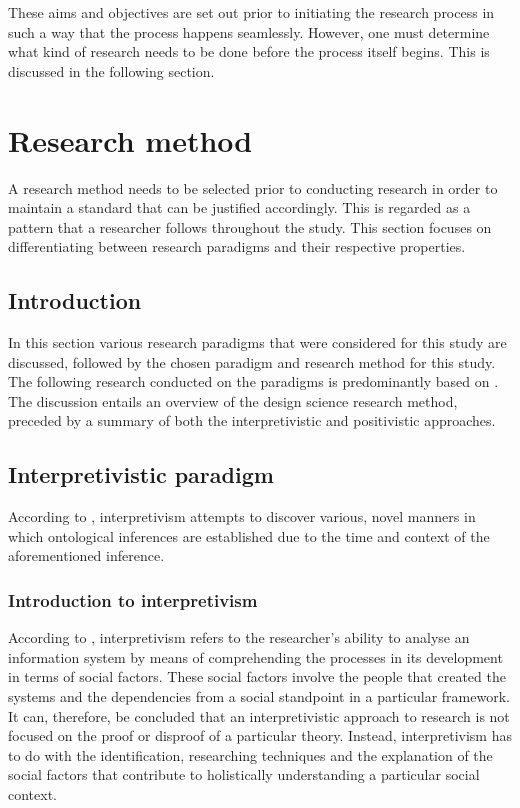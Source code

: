 These aims and objectives are set out prior to initiating the research process in such a way that the process happens seamlessly. However, one must determine what kind of research needs to be done before the process itself begins. This is discussed in the following section.

\section{Research method}  %
A research method needs to be selected prior to conducting research in order to maintain a standard that can be justified accordingly. This is regarded as a pattern that a researcher follows throughout the study. This section focuses on differentiating between research paradigms and their respective properties.

\subsection{Introduction}
In this section various research paradigms that were considered for this study are discussed, followed by the chosen paradigm and research method for this study. The following research conducted on the paradigms is predominantly based on \citep{OatesJ2006}. The discussion entails an overview of the design science research method, preceded by a summary of both the interpretivistic and positivistic approaches.

\subsection{Interpretivistic paradigm}
According to \cite{DeVilliers2005}, interpretivism attempts to discover various, novel manners in which ontological inferences are established due to the time and context of the aforementioned inference.

\subsubsection{Introduction to interpretivism}
According to \cite{OatesJ2006}, interpretivism refers to the researcher’s ability to analyse an information system by means of comprehending the processes in its development in terms of social factors. These social factors involve the people that created the systems and the dependencies from a social standpoint in a particular framework.
It can, therefore, be concluded that an interpretivistic approach to research is not focused on the proof or disproof of a particular theory. Instead, interpretivism has to do with the identification, researching techniques and the explanation of the social factors that contribute to holistically understanding a particular social context.
